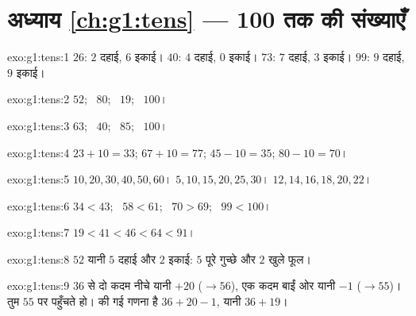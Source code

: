 \section*{अध्याय \ref{ch:g1:tens} --- 100 तक की संख्याएँ}

\begin{solution}{exo:g1:tens:1}
$26$: $2$ दहाई, $6$ इकाई। $40$: $4$ दहाई, $0$ इकाई। $73$: $7$
दहाई, $3$ इकाई। $99$: $9$ दहाई, $9$ इकाई।
\end{solution}

\begin{solution}{exo:g1:tens:2}
$52$; \ $80$; \ $19$; \ $100$।
\end{solution}

\begin{solution}{exo:g1:tens:3}
$63$; \ $40$; \ $85$; \ $100$।
\end{solution}

\begin{solution}{exo:g1:tens:4}
$23 + 10 = 33$; \quad $67 + 10 = 77$; \quad $45 - 10 = 35$; \quad
$80 - 10 = 70$।
\end{solution}

\begin{solution}{exo:g1:tens:5}
$10, 20, 30, 40, 50, 60$। \quad $5, 10, 15, 20, 25, 30$। \quad
$12, 14, 16, 18, 20, 22$।
\end{solution}

\begin{solution}{exo:g1:tens:6}
$34 < 43$; \ $58 < 61$; \ $70 > 69$; \ $99 < 100$।
\end{solution}

\begin{solution}{exo:g1:tens:7}
$19 < 41 < 46 < 64 < 91$।
\end{solution}

\begin{solution}{exo:g1:tens:8}
$52$ यानी $5$ दहाई और $2$ इकाई: $5$ पूरे गुच्छे और $2$ खुले
फूल।
\end{solution}

\begin{solution}{exo:g1:tens:9}
$36$ से दो कदम नीचे यानी $+20$ ($\to 56$), एक कदम बाईं ओर यानी
$-1$ ($\to 55$)। तुम $55$ पर पहुँचते हो। की गई गणना है
$36 + 20 - 1$, यानी $36 + 19$।
\end{solution}

